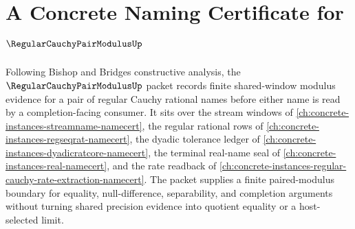 \chapter{A Concrete Naming Certificate for $\RegularCauchyPairModulusUp$}
\label{ch:concrete-instances-regular-cauchy-pair-modulus-namecert}

Following Bishop and Bridges constructive analysis, the $\RegularCauchyPairModulusUp$ packet records finite shared-window modulus evidence for a pair of regular Cauchy rational names before either name is read by a completion-facing consumer. It sits over the stream windows of \autoref{ch:concrete-instances-streamname-namecert}, the regular rational rows of \autoref{ch:concrete-instances-regseqrat-namecert}, the dyadic tolerance ledger of \autoref{ch:concrete-instances-dyadicratcore-namecert}, the terminal real-name seal of \autoref{ch:concrete-instances-real-namecert}, and the rate readback of \autoref{ch:concrete-instances-regular-cauchy-rate-extraction-namecert}. The packet supplies a finite paired-modulus boundary for equality, null-difference, separability, and completion arguments without turning shared precision evidence into quotient equality or a host-selected limit.

